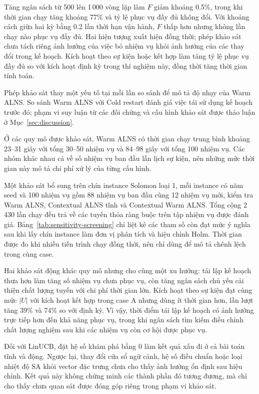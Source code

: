 \documentclass[11pt,a4paper]{article}
\begin{document}
Tăng ngân sách từ 500 lên 1\,000 vòng lặp làm $F$ giảm khoảng 0.5\%, trong khi thời gian chạy tăng khoảng 77\% và tỷ lệ phục vụ đầy đủ không đổi. Với khoảng cách giữa hai kỳ bằng 0.2 lần thời hạn vận hành, $F$ thấp hơn nhưng không lần chạy nào phục vụ đầy đủ. Hai hiện tượng xuất hiện đồng thời; phép khảo sát chưa tách riêng ảnh hưởng của việc bỏ nhiệm vụ khỏi ảnh hưởng của các thay đổi trong kế hoạch. Kích hoạt theo sự kiện hoặc kết hợp làm tăng tỷ lệ phục vụ đầy đủ so với kích hoạt định kỳ trong thí nghiệm này, đồng thời tăng thời gian tính toán.

Phép khảo sát thay một yếu tố tại mỗi lần so sánh để mô tả độ nhạy của Warm ALNS. So sánh Warm ALNS với Cold restart đánh giá việc tái sử dụng kế hoạch trước đó; phạm vi suy luận từ các đối chứng và cấu hình khảo sát được thảo luận ở Mục~\ref{sec:discussion}.

Ở các quy mô được khảo sát, Warm ALNS có thời gian chạy trung bình khoảng 23--31 giây với tổng 30--50 nhiệm vụ và 84--98 giây với tổng 100 nhiệm vụ. Các nhóm khác nhau cả về số nhiệm vụ ban đầu lẫn lịch sự kiện, nên những mức thời gian này mô tả chi phí xử lý của từng cấu hình.

Một khảo sát bổ sung trên chín instance Solomon loại 1, mỗi instance có năm seed và 100 nhiệm vụ gồm 88 nhiệm vụ ban đầu cùng 12 nhiệm vụ mới, kiểm tra Warm ALNS, Contextual ALNS tĩnh và Contextual Warm ALNS. Tổng cộng 2\,430 lần chạy đều trả về các tuyến thỏa ràng buộc trên tập nhiệm vụ được đánh giá. Bảng~\ref{tab:sensitivity-screening} chỉ liệt kê các tham số còn đạt mức ý nghĩa sau khi lấy chín instance làm đơn vị phân tích và hiệu chỉnh Holm. Thời gian được đo khi nhiều tiến trình chạy đồng thời, nên chỉ dùng để mô tả chênh lệch trong cùng case.

Hai khảo sát động khác quy mô nhưng cho cùng một xu hướng: tái lập kế hoạch thưa hơn làm tăng số nhiệm vụ chưa phục vụ, còn tăng ngân sách chủ yếu cải thiện chất lượng tuyến với chi phí thời gian lớn. Kích hoạt theo sự kiện đạt cùng mức $|U|$ với kích hoạt kết hợp trong case A nhưng dùng ít thời gian hơn, lần lượt tăng 39\% và 74\% so với định kỳ. Vì vậy, thời điểm tái lập kế hoạch có ảnh hưởng trực tiếp hơn đến khả năng phục vụ, trong khi ngân sách tìm kiếm điều chỉnh chất lượng nghiệm sau khi các nhiệm vụ còn cơ hội được phục vụ.

Đối với LinUCB, đặt hệ số khám phá bằng 0 làm kết quả xấu đi ở cả bài toán tĩnh và động. Ngược lại, thay đổi cửa sổ ngữ cảnh, hệ số điều chuẩn hoặc loại nhiệt độ SA khỏi vector đặc trưng chưa cho thấy ảnh hưởng ổn định sau hiệu chỉnh. Kết quả này không chứng minh các thành phần đó tương đương, mà chỉ cho thấy chưa quan sát được đóng góp riêng trong phạm vi khảo sát.
\end{document}

